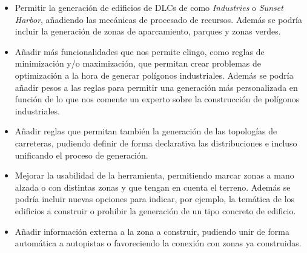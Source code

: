 \begin{itemize}
	\item Permitir la generación de edificios de DLCs de \cities como \textit{Industries} o \textit{Sunset Harbor}, añadiendo las mecánicas de procesado de recursos. Además se podría incluir la generación de zonas de aparcamiento, parques y zonas verdes.
	\item Añadir más funcionalidades que nos permite clingo, como reglas de minimización y/o maximización, que permitan crear problemas de optimización a la hora de generar polígonos industriales. Además se podría añadir pesos a las reglas para permitir una generación más personalizada en función de lo que nos comente un experto sobre la construcción de polígonos industriales.
	\item Añadir reglas que permitan también la generación de las topologías de carreteras, pudiendo definir de forma declarativa las distribuciones e incluso unificando el proceso de generación.
	\item Mejorar la usabilidad de la herramienta, permitiendo marcar zonas a mano alzada o con distintas zonas y que tengan en cuenta el terreno. Además se podría incluir nuevas opciones para indicar, por ejemplo, la temática de los edificios a construir o prohibir la generación de un tipo concreto de edificio.
	\item Añadir información externa a la zona a construir, pudiendo unir de forma automática a autopistas o favoreciendo la conexión con zonas ya construidas.
\end{itemize}